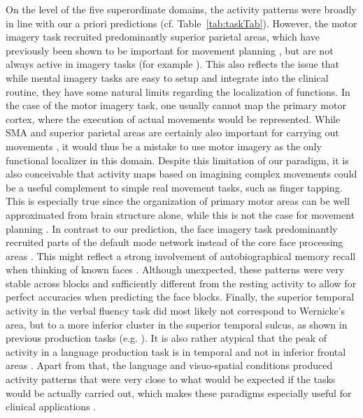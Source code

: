 \documentclass[fleqn,10pt]{SelfArx} %
\begin{document}
On the level of the five superordinate domains, the activity patterns were broadly in line with our a priori predictions (cf. Table~\ref{tab:taskTab}). However, the motor imagery task recruited predominantly superior parietal areas, which have previously been shown to be important for movement planning \citep{Aflalo_2015}, but are not always active in imagery tasks (for example \citet{Owen_2006}). This also reflects the issue that while mental imagery tasks are easy to setup and integrate into the clinical routine, they have some natural limits regarding the localization of functions. In the case of the motor imagery task, one usually cannot map the primary motor cortex, where the execution of actual movements would be represented. While SMA and superior parietal areas are certainly also important for carrying out movements \citep{Fontaine_2002, Aflalo_2015}, it would thus be a mistake to use motor imagery as the only functional localizer in this domain. Despite this limitation of our paradigm, it is also conceivable that activity maps based on imagining complex movements could be a useful complement to simple real movement tasks, such as finger tapping. This is especially true since the organization of primary motor areas can be well approximated from brain structure alone, while this is not the case for movement planning \citep{Aflalo_2015}.
In contrast to our prediction, the face imagery task predominantly recruited parts of the default mode network instead of the core face processing areas \citep{Haxby_2000}. This might reflect a strong involvement of autobiographical memory recall when thinking of known faces \citep{Gobbini_2007}. Although unexpected, these patterns were very stable across blocks and sufficiently different from the resting activity to allow for perfect accuracies when predicting the face blocks.
Finally, the superior temporal activity in the verbal fluency task did most likely not correspond to Wernicke's area, but to a more inferior cluster in the superior temporal sulcus, as shown in previous production tasks (e.g. \citet{Branco_2016}). It is also rather atypical that the peak of activity in a language production task is in temporal and not in inferior frontal areas \citep{Woermann_2003}. Apart from that, the language and visuo-spatial conditions produced activity patterns that were very close to what would be expected if the tasks would be actually carried out, which makes these paradigms especially useful for clinical applications \citep{Woermann_2003, Jokeit_2001}.
\end{document}
